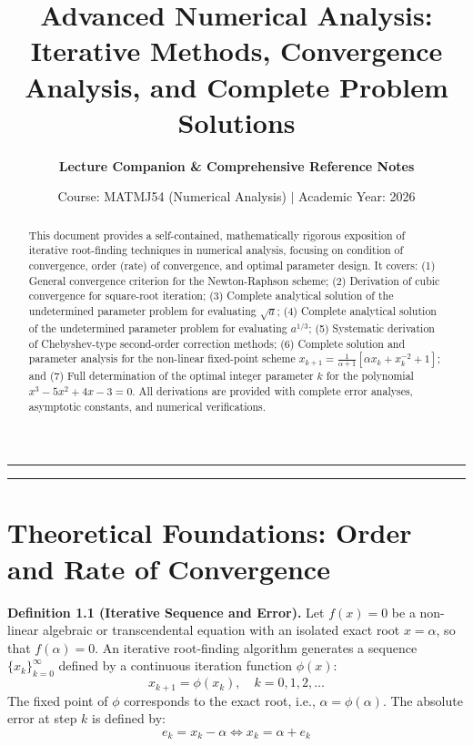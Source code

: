 \documentclass[11pt,a4paper]{article}
\title{\vspace{-1.5cm}\LARGE\bfseries\color{navyblue} Advanced Numerical Analysis: Iterative Methods, Convergence Analysis, and Complete Problem Solutions\vspace{0.3cm}}
\author{\textbf{Lecture Companion \& Comprehensive Reference Notes}}
\date{\small Course: MATMJ54 (Numerical Analysis) \quad $\vert$ \quad Academic Year: 2026}
\numberwithin{equation}{section}
\begin{document}
\maketitle
\thispagestyle{fancy}

\begin{abstract}
\noindent This document provides a self-contained, mathematically rigorous exposition of iterative root-finding techniques in numerical analysis, focusing on condition of convergence, order (rate) of convergence, and optimal parameter design. It covers: (1) General convergence criterion for the Newton-Raphson scheme; (2) Derivation of cubic convergence for square-root iteration; (3) Complete analytical solution of the undetermined parameter problem for evaluating $\sqrt{a}$; (4) Complete analytical solution of the undetermined parameter problem for evaluating $a^{1/3}$; (5) Systematic derivation of Chebyshev-type second-order correction methods; (6) Complete solution and parameter analysis for the non-linear fixed-point scheme $x_{k+1} = \frac{1}{\alpha + 1}\left[\alpha x_k + x_k^{-2} + 1\right]$; and (7) Full determination of the optimal integer parameter $k$ for the polynomial $x^3 - 5x^2 + 4x - 3 = 0$. All derivations are provided with complete error analyses, asymptotic constants, and numerical verifications.
\end{abstract}

\vspace{0.2cm}
\hrule
\vspace{0.4cm}

\tableofcontents

\vspace{0.5cm}
\hrule
\vspace{0.6cm}

\section{Theoretical Foundations: Order and Rate of Convergence}

\begin{defnbox}
\textbf{Definition 1.1 (Iterative Sequence and Error).}
Let $f(x) = 0$ be a non-linear algebraic or transcendental equation with an isolated exact root $x = \alpha$, so that $f(\alpha) = 0$. An iterative root-finding algorithm generates a sequence $\{x_k\}_{k=0}^\infty$ defined by a continuous iteration function $\phi(x)$:
\begin{equation}
    x_{k+1} = \phi(x_k), \quad k = 0, 1, 2, \dots
\end{equation}
The fixed point of $\phi$ corresponds to the exact root, i.e., $\alpha = \phi(\alpha)$. The absolute error at step $k$ is defined by:
\begin{equation}
    e_k = x_k - \alpha \iff x_k = \alpha + e_k
\end{equation}
\end{defnbox}
\end{document}

